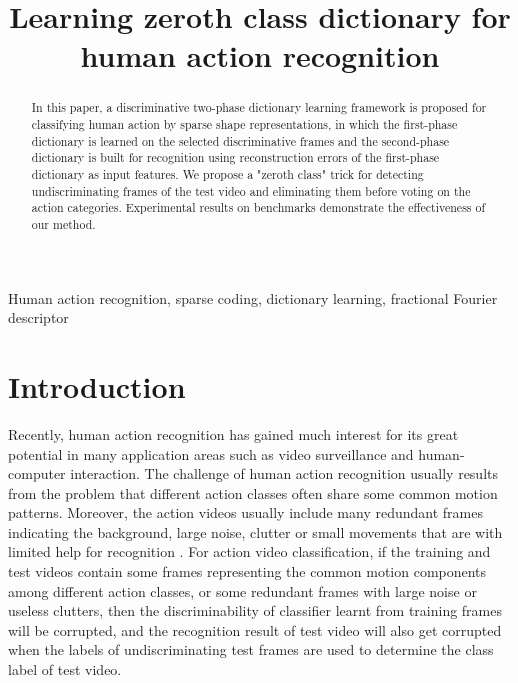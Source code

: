 \documentclass{article}
\title{Learning zeroth class dictionary for human action recognition}
\begin{document}
\maketitle
\begin{abstract}
 In this paper, a discriminative two-phase dictionary learning framework is proposed for classifying human action  by sparse shape representations, in which the first-phase dictionary is learned on the selected discriminative frames and the second-phase dictionary is built for recognition using reconstruction errors of the first-phase dictionary as input features.
 We  propose a "zeroth class" trick for detecting undiscriminating frames of the test video and eliminating them before voting on the action categories.
   Experimental results on benchmarks demonstrate  the effectiveness  of our method.
\end{abstract}
\begin{keywords}
Human action recognition, sparse coding, dictionary learning, fractional Fourier descriptor
\end{keywords}
\section{Introduction}




Recently, human action recognition has gained much interest for its great  potential in many application areas such as video surveillance and human-computer interaction.
The challenge of human action recognition usually results from the problem that different action classes often share some common motion patterns.
Moreover, the action videos usually include many redundant frames indicating the background, large noise, clutter or small movements that are with limited help for recognition \cite{cai2013human}.
For action video classification, if the training and test videos contain some frames representing the common motion components among different action classes, or some redundant frames  with large noise or useless clutters, then the discriminability of  classifier learnt from training frames will be corrupted, and the recognition result of test video will also get corrupted when the labels of undiscriminating  test frames are used to determine the class label of test video.
\end{document}
